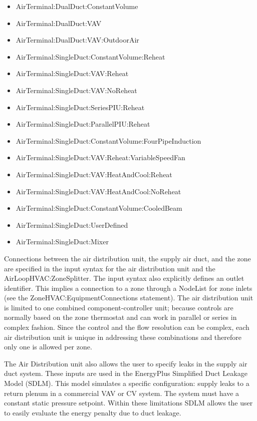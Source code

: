 \begin{itemize}
\item
  AirTerminal:DualDuct:ConstantVolume
\item
  AirTerminal:DualDuct:VAV
\item
  AirTerminal:DualDuct:VAV:OutdoorAir
\item
  AirTerminal:SingleDuct:ConstantVolume:Reheat
\item
  AirTerminal:SingleDuct:VAV:Reheat
\item
  AirTerminal:SingleDuct:VAV:NoReheat
\item
  AirTerminal:SingleDuct:SeriesPIU:Reheat
\item
  AirTerminal:SingleDuct:ParallelPIU:Reheat
\item
  AirTerminal:SingleDuct:ConstantVolume:FourPipeInduction
\item
  AirTerminal:SingleDuct:VAV:Reheat:VariableSpeedFan
\item
  AirTerminal:SingleDuct:VAV:HeatAndCool:Reheat
\item
  AirTerminal:SingleDuct:VAV:HeatAndCool:NoReheat
\item
  AirTerminal:SingleDuct:ConstantVolume:CooledBeam
\item
  AirTerminal:SingleDuct:UserDefined
\item
  AirTerminal:SingleDuct:Mixer
 
\end{itemize}
   
Connections between the air distribution unit, the supply air duct, and the zone are specified in the input syntax for the air distribution unit and the AirLoopHVAC:ZoneSplitter. The input syntax also explicitly defines an outlet identifier. This implies a connection to a zone through a NodeList for zone inlets (see the ZoneHVAC:EquipmentConnections statement). The air distribution unit is limited to one combined component-controller unit; because controls are normally based on the zone thermostat and can work in parallel or series in complex fashion. Since the control and the flow resolution can be complex, each air distribution unit is unique in addressing these combinations and therefore only one is allowed per zone.

The Air Distribution unit also allows the user to specify leaks in the supply air duct system. These inputs are used in the EnergyPlus Simplified Duct Leakage Model (SDLM). This model simulates a specific configuration: supply leaks to a return plenum in a commercial VAV or CV system. The system must have a constant static pressure setpoint. Within these limitations SDLM allows the user to easily evaluate the energy penalty due to duct leakage.

